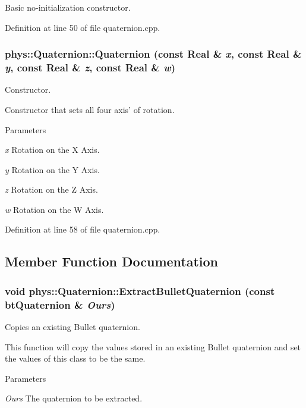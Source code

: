 Basic no-\/initialization constructor. 

Definition at line 50 of file quaternion.cpp.

\hypertarget{classphys_1_1Quaternion_ac8037875c08ce10c0195f3e6fd08b172}{
\subsubsection[{Quaternion}]{\setlength{\rightskip}{0pt plus 5cm}phys::Quaternion::Quaternion (const {\bf Real} \& {\em x}, \/  const {\bf Real} \& {\em y}, \/  const {\bf Real} \& {\em z}, \/  const {\bf Real} \& {\em w})}}
\label{df/d8c/classphys_1_1Quaternion_ac8037875c08ce10c0195f3e6fd08b172}


Constructor. 

Constructor that sets all four axis' of rotation. 
\begin{DoxyParams}{Parameters}
\item[{\em x}]Rotation on the X Axis. \item[{\em y}]Rotation on the Y Axis. \item[{\em z}]Rotation on the Z Axis. \item[{\em w}]Rotation on the W Axis. \end{DoxyParams}


Definition at line 58 of file quaternion.cpp.



\subsection{Member Function Documentation}
\hypertarget{classphys_1_1Quaternion_a10d3582b2731e70279d7bab43173f317}{
\subsubsection[{ExtractBulletQuaternion}]{\setlength{\rightskip}{0pt plus 5cm}void phys::Quaternion::ExtractBulletQuaternion (const btQuaternion \& {\em Ours})}}
\label{df/d8c/classphys_1_1Quaternion_a10d3582b2731e70279d7bab43173f317}


Copies an existing Bullet quaternion. 

This function will copy the values stored in an existing Bullet quaternion and set the values of this class to be the same. 
\begin{DoxyParams}{Parameters}
\item[{\em Ours}]The quaternion to be extracted. \end{DoxyParams}


